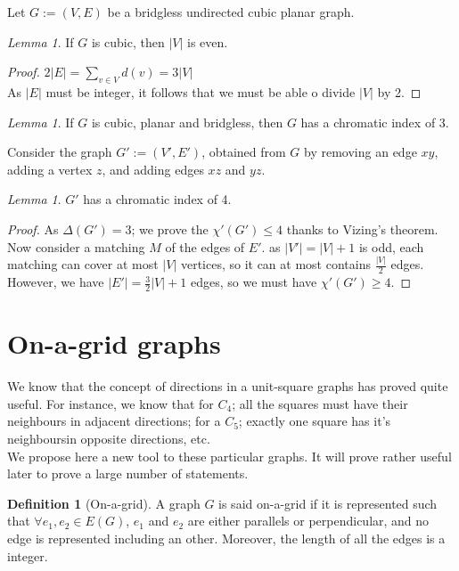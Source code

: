\documentclass[12pt]{article}
\theoremstyle{definition}
\newtheorem{definition}{Definition}[section]
\theoremstyle{remark}
\newtheorem{lemma}[theorem]{Lemma}
\begin{document}
    

Let $G:= (V, E)$ be a bridgless undirected cubic planar graph.
\begin{lemma}
    If $G$ is cubic, then $|V|$ is even.
\end{lemma}

\begin{proof}
    $2|E| = \sum_{v \in V} d(v) = 3|V| $ \\
    As $|E|$ must be integer, it follows that we must be able o divide $|V|$ by 2.
\end{proof}

\begin{lemma}
    If $G$ is cubic, planar and bridgless, then $G$ has a chromatic index of 3. 
\end{lemma}


Consider the graph $G':= (V', E')$, obtained from $G$ by removing an edge $xy$, adding a vertex $z$, and adding edges $xz$ and $yz$. 
\begin{lemma}
    $G'$ has a chromatic index of 4.
\end{lemma}

\begin{proof}
    As $\Delta(G') = 3$; we prove the $\chi'(G') \le 4$ thanks to Vizing's theorem.\\
    Now consider a matching $M$ of the edges of $E'$. as $|V'| = |V|+1$ is odd, each matching can cover at most $|V|$ vertices,
    so it can at most contains $\tfrac{|V|}{2}$ edges. However, we have $|E'| = \tfrac{3}{2} |V| + 1$ edges, so we must have $\chi'(G') \ge 4$.
\end{proof}






\newpage
\section{On-a-grid graphs}

We know that the concept of directions in a unit-square graphs has proved quite useful. For instance, we know that for $C_4$; all the squares must have their
neighbours in adjacent directions; for a $C_5$; exactly one square has it's neighboursin opposite directions, etc. \\
We propose here a new tool to these particular graphs. It will prove rather useful later to prove a large number of statements. 

\begin{definition} [On-a-grid]
    A graph $G$ is said on-a-grid if it is represented such that $\forall e_1, e_2 \in E(G)$, $e_1$ and $e_2$ are either parallels or perpendicular, and no edge is represented including an other.
    Moreover, the length of all the edges is a integer. 
\end{definition}
\end{document}
